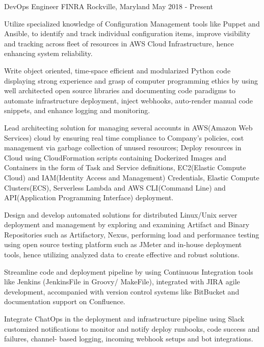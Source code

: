 

\begin{cventries}

  \cventry
    {DevOps Engineer} %
    {FINRA} %
    {Rockville, Maryland} %
    {May 2018 - Present} %
    {
      \begin{cvitems} %
        \item {Utilize specialized knowledge of Configuration Management tools like Puppet and Ansible, to identify and track individual configuration items, improve visibility and tracking across fleet of resources in AWS Cloud Infrastructure, hence enhancing system reliability.}
        \item {Write object oriented, time-space efficient and modularized Python code displaying strong experience and grasp of computer programming ethics by using well architected open source libraries and documenting code paradigms to automate infrastructure deployment, inject webhooks, auto-render manual code snippets, and enhance logging and monitoring.}
        \item {Lead architecting solution for managing several accounts in AWS(Amazon Web Services) cloud by ensuring real time compliance to Company’s policies, cost management via garbage collection of unused resources; Deploy resources in Cloud using CloudFormation scripts containing Dockerized Images and Containers in the form of Task and Service definitions, EC2(Elastic Compute Cloud) and IAM(Identity Access and Management) Credentials, Elastic Compute Clusters(ECS), Serverless Lambda and AWS CLI(Command Line) and API(Application Programming Interface) deployment.}
        \item {Design and develop automated solutions for distributed Linux/Unix server deployment and management by exploring and examining Artifact and Binary Repositories such as Artifactory, Nexus, performing load and performance testing using open source testing platform such as JMeter and in-house deployment tools, hence utilizing analyzed data to create effective and robust solutions.}
        \item {Streamline code and deployment pipeline by using Continuous Integration tools like Jenkins (JenkinsFile in Groovy/ MakeFile), integrated with JIRA agile development, accompanied with version control systems like BitBucket and documentation support on Confluence.}
        \item {Integrate ChatOps in the deployment and infrastructure pipeline using Slack customized notifications to monitor and notify deploy runbooks, code success and failures, channel- based logging, incoming webhook setups and bot integrations.}
      \end{cvitems}
    }


\end{cventries}

